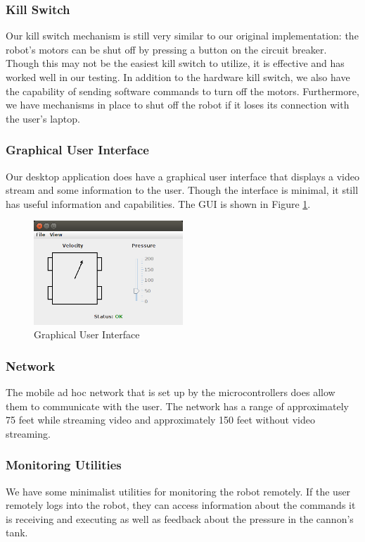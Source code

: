 \documentclass[letterpaper,12pt]{article}
\begin{document}
\subsubsection{Kill Switch}
Our kill switch mechanism is still very similar to our original implementation:
the robot's motors can be shut off by pressing a button on the circuit
breaker. Though this may not be the easiest kill switch to utilize, it is
effective and has worked well in our testing. In addition to the hardware kill
switch, we also have the capability of sending software commands to turn off the
motors. Furthermore, we have mechanisms in place to shut off the robot if it
loses its connection with the user's laptop.

\subsubsection{Graphical User Interface}
Our desktop application does have a graphical user interface that displays a
video stream and some information to the user. Though the interface is minimal,
it still has useful information and capabilities. The GUI is shown in Figure
\ref{fig:gui}.

\begin{figure}[h!]
  \centering
  \includegraphics[width=0.5\textwidth]{pics/gui.png}
  \caption{Graphical User Interface}
  \label{fig:gui}
\end{figure}

\subsubsection{Network}
The mobile ad hoc network that is set up by the microcontrollers does allow them
to communicate with the user. The network has a range of approximately 75 feet
while streaming video and approximately 150 feet without video streaming.

\subsubsection{Monitoring Utilities}
We have some minimalist utilities for monitoring the robot remotely. If the user
remotely logs into the robot, they can access information about the commands it
is receiving and executing as well as feedback about the pressure in the
cannon's tank.
\end{document}
